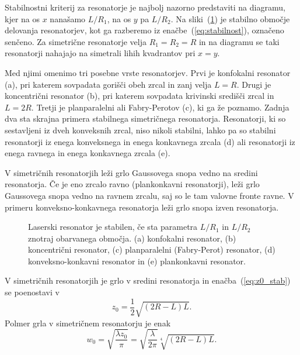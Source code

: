 Stabilnostni kriterij za resonatorje je najbolj nazorno predstaviti na diagramu, 
kjer na os $x$ nanašamo $L/R_{1}$, na os $y$ pa $L/R_{2}$. Na 
sliki~(\ref{fig:Podrocje-stabilnih-resonatorjev}) je stabilno območje delovanja 
resonatorjev, kot ga razberemo iz enačbe~(\ref{eq:stabilnost}), označeno senčeno.
Za simetrične resonatorje 
velja $R_{1}=R_{2}=R$ in na diagramu se taki resonatorji nahajajo na simetrali 
lihih kvadrantov pri $x=y$. 

Med njimi omenimo tri posebne vrste resonatorjev.
Prvi je konfokalni resonator (a), 
pri katerem sovpadata gorišči obeh zrcal in zanj velja $L=R$. Drugi je 
koncentrični resonator (b), pri katerem sovpadata krivinski središči zrcal in $L=2R$.
Tretji je planparalelni ali Fabry-Perotov (c), ki ga že poznamo. 
Zadnja dva sta skrajna primera stabilnega simetričnega resonatorja. 
Resonatorji, ki so sestavljeni iz dveh konveksnih zrcal, niso nikoli stabilni, lahko
pa so stabilni resonatorji iz enega konveksnega in enega konkavnega zrcala (d)
ali resonatorji iz enega ravnega in enega konkavnega zrcala (e). 

V simetričnih resonatorjih leži grlo Gaussovega snopa vedno na sredini resonatorja.
Če je eno zrcalo ravno (plankonkavni resonatorji), leži grlo Gaussovega snopa vedno 
na ravnem zrcalu, saj so le tam valovne fronte ravne. V primeru konveksno-konkavnega 
resonatorja leži grlo snopa izven resonatorja. 

\begin{figure}[h]
\centering
\def\svgwidth{100truemm} 

\caption{Laserski resonator je stabilen, 
če sta parametra $L/R_{1}$ in $L/R_{2}$ znotraj obarvanega območja. 
(a) konfokalni resonator,
(b) koncentrični resonator, 
(c) planparalelni (Fabry-Perot) resonator, 
(d) konveksno-konkavni resonator 
in (e) plankonkavni resonator.}
\label{fig:Podrocje-stabilnih-resonatorjev}
\end{figure}

V simetričnih resonatorjih je grlo v sredini resonatorja in enačba~(\ref{eq:z0_stab}) 
se poenostavi v 
\begin{equation}
z_{0}=\frac{1}{2}\sqrt{(2R-L)L}.
\label{eq:zosim}
\end{equation}
Polmer grla v simetričnem resonatorju je enak
\begin{equation}
w_{0}=\sqrt{\frac{\lambda z_{0}}{\pi}}=\sqrt{\frac{\lambda}{2\pi}}\sqrt[4]{(2R-L)L}.
\label{eq:grlo_v_res}
\end{equation}

